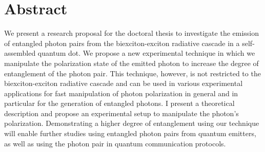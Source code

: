 \section*{Abstract}
We present a research proposal for the doctoral thesis to investigate the emission of entangled photon pairs from the biexciton-exciton radiative cascade in a self-assembled quantum dot. We propose a new experimental technique in which we manipulate the polarization state of the emitted photon to increase the degree of entanglement of the photon pair.
This technique, however, is not restricted to the biexciton-exciton radiative cascade and can be used in various experimental applications for fast manipulation of photon polarization in general and in particular for the generation of entangled photons. I present a theoretical description and propose an experimental setup to manipulate the photon's polarization.
Demonstrating a higher degree of entanglement using our technique will enable further studies using entangled photon pairs from quantum emitters, as well as using the photon pair in quantum communication protocols.

